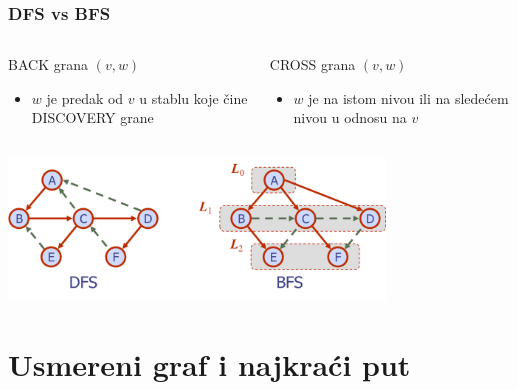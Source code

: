 \documentclass[compress,aspectratio=169]{beamer}
\begin{document}
\begin{frame}[fragile]
  \frametitle{DFS vs BFS}
  \begin{columns}
    \begin{column}[t]{6cm}
      {\scriptsize BACK} grana $(v,w)$
      \begin{itemize}
        \item $w$ je predak od $v$ u stablu koje čine {\scriptsize 
          DISCOVERY} grane
      \end{itemize}
    \end{column}
    \begin{column}[t]{6cm}
      {\scriptsize CROSS} grana $(v,w)$
      \begin{itemize}
        \item $w$ je na istom nivou ili na sledećem nivou u odnosu na 
          $v$
      \end{itemize}
    \end{column}
  \end{columns}
  \begin{center}
    \includegraphics[width=10cm]{asp-14-pic26.png}
  \end{center}
\end{frame}

\section[Usmereni graf]{Usmereni graf i najkraći put}
\end{document}
